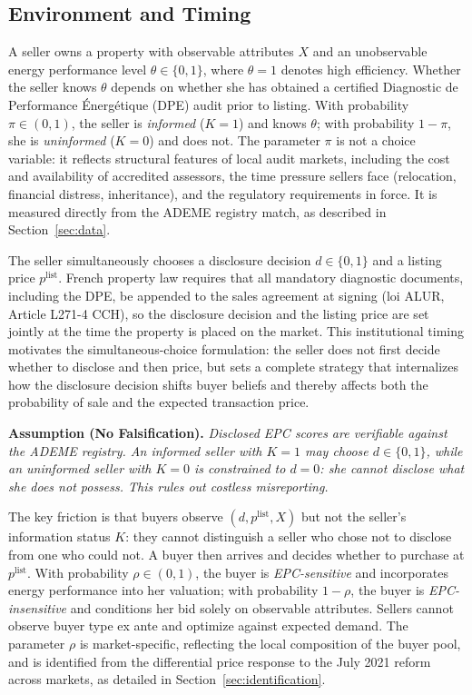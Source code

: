 \documentclass[10pt,letterpaper]{bp-template-concise}
\begin{document}
\subsection{Environment and Timing}

A seller owns a property with observable attributes $X$ and an unobservable energy performance level $\theta \in \{0,1\}$, where $\theta=1$ denotes high efficiency. Whether the seller knows $\theta$ depends on whether she has obtained a certified Diagnostic de Performance \'{E}nerg\'{e}tique (DPE) audit prior to listing. With probability $\pi\in(0,1)$, the seller is \emph{informed} ($K=1$) and knows $\theta$; with probability $1-\pi$, she is \emph{uninformed} ($K=0$) and does not. The parameter $\pi$ is not a choice variable: it reflects structural features of local audit markets, including the cost and availability of accredited assessors, the time pressure sellers face (relocation, financial distress, inheritance), and the regulatory requirements in force. It is measured directly from the ADEME registry match, as described in Section~\ref{sec:data}.

The seller simultaneously chooses a disclosure decision $d\in\{0,1\}$ and a listing price $p^{\text{list}}$. French property law requires that all mandatory diagnostic documents, including the DPE, be appended to the sales agreement at signing (loi ALUR, Article L271-4 CCH), so the disclosure decision and the listing price are set jointly at the time the property is placed on the market. This institutional timing motivates the simultaneous-choice formulation: the seller does not first decide whether to disclose and then price, but sets a complete strategy that internalizes how the disclosure decision shifts buyer beliefs and thereby affects both the probability of sale and the expected transaction price.

\noindent\textbf{Assumption (No Falsification).} \textit{Disclosed EPC scores are verifiable against the ADEME registry. An informed seller with $K=1$ may choose $d\in\{0,1\}$, while an uninformed seller with $K=0$ is constrained to $d=0$: she cannot disclose what she does not possess. This rules out costless misreporting.}

\medskip
The key friction is that buyers observe $(d, p^{\text{list}}, X)$ but not the seller's information status $K$: they cannot distinguish a seller who chose not to disclose from one who could not. A buyer then arrives and decides whether to purchase at $p^{\text{list}}$. With probability $\rho\in(0,1)$, the buyer is \emph{EPC-sensitive} and incorporates energy performance into her valuation; with probability $1-\rho$, the buyer is \emph{EPC-insensitive} and conditions her bid solely on observable attributes. Sellers cannot observe buyer type ex ante and optimize against expected demand. The parameter $\rho$ is market-specific, reflecting the local composition of the buyer pool, and is identified from the differential price response to the July 2021 reform across markets, as detailed in Section~\ref{sec:identification}.
\end{document}
